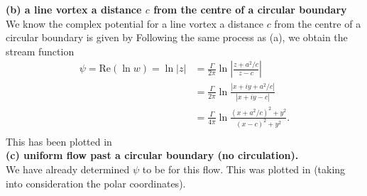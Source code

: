 \documentclass[12pt]{book}
\begin{document}
{\textbf{(b) a line vortex a distance $c$ from the centre of a circular boundary}\\
We know the complex potential for a line vortex a distance $c$ from the centre of a circular boundary is given by
Following the same process as (a), we obtain the stream function
\begin{align*}
\psi = \mathrm{Re}(\ln{w} ) = \ln|z| 
&= \frac{\Gamma}{2\pi}\ln\left|\frac{z +a^2 / c}{z-c}\right| \\
 & = \frac{\Gamma}{2\pi}\ln\frac{|x + iy + a^2 / c|}{|x + iy -c|} \\
 & = \frac{\Gamma}{4\pi}\ln\frac{(x + a^2 / c)^2 + y^2}{(x-c)^2 + y^2}. \\
\end{align*}
This has been plotted in \\

\textbf{(c) uniform flow past a circular boundary (no circulation).}\\

We have already determined $\psi$ to be
for this flow.  This was plotted in  (taking into consideration the polar coordinates).


}

\renewcommand{\arraystretch}{1.25}
\end{document}
